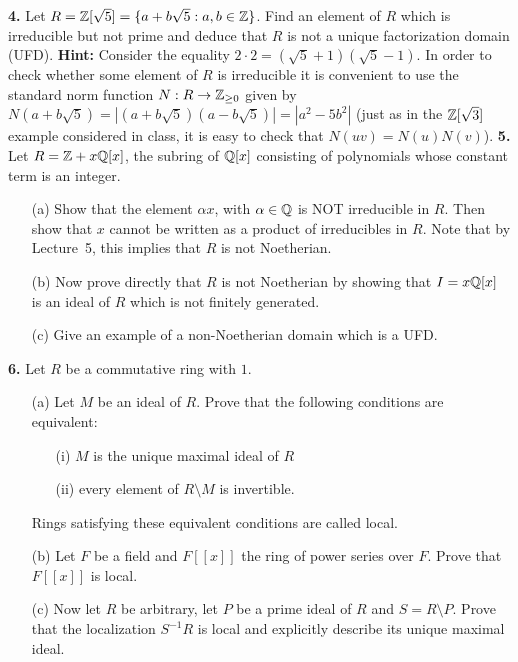 \documentclass[12pt]{amsart}
\begin{document}
{\bf 4.} Let $R={\mathbb Z}[\sqrt{5}]=\{a+b\sqrt{5} : a,b\in{\mathbb Z}\}$. Find an element of $R$
which is irreducible but not prime and deduce that $R$ is not a unique factorization domain (UFD).
\skv
 {\bf Hint:} Consider the equality $2\cdot 2=(\sqrt{5}+1)(\sqrt{5}-1)$. In order to check
whether some element of $R$ is irreducible it is convenient to use the standard norm function
$N:R\to{\mathbb Z}_{\geq 0}$ given by $N(a+b\sqrt{5})=|(a+b\sqrt{5})(a-b\sqrt{5})|=|a^2-5b^2|$ (just as in the ${\mathbb Z}[\sqrt{3}]$ example considered in class,
it is easy to check that $N(uv)=N(u)N(v)$).
\skv\skv 
{\bf 5.} Let $R={\mathbb Z}+x{\mathbb Q}[x]$, the subring of ${\mathbb Q}[x]$ consisting of
polynomials whose constant term is an integer.
\begin{itemize}
\item[(a)] Show that the element $\alpha x$, with $\alpha\in{\mathbb Q}$ is NOT irreducible
in $R$. Then show that $x$ cannot be written as a product of irreducibles in $R$.
Note that by Lecture~5, this implies that $R$ is not Noetherian.

\item[(b)] Now prove directly that $R$ is not Noetherian by showing that
$I=x{\mathbb Q}[x]$ is an ideal of $R$ which is not finitely generated.

\item[(c)] Give an example of a non-Noetherian domain which is a UFD.
\end{itemize}
\skv
{\bf 6.} Let $R$ be a commutative ring with $1$. 
\begin{itemize}
\item[(a)]   Let $M$ be an ideal of $R$. Prove that the following conditions are equivalent:
\begin{itemize}
\item[(i)] $M$ is the unique maximal ideal of $R$ 
\item[(ii)] every element of $R\setminus M$ is invertible. 
\end{itemize}
Rings satisfying these equivalent conditions are called local.
\item[(b)] Let $F$ be a field and $F[[x]]$ the ring of power series over $F$. Prove that $F[[x]]$ is local.
\item[(c)] Now let $R$ be arbitrary, let $P$ be a prime ideal of $R$ and $S=R\setminus P$. Prove that the localization
$S^{-1}R$ is local and explicitly describe its unique maximal ideal.
\end{itemize}
\end{document}
